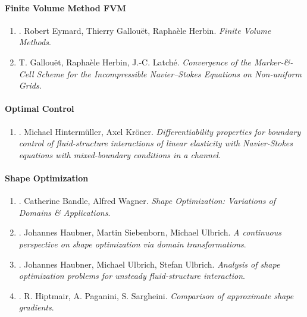 \documentclass{article}
\begin{document}
\paragraph{Finite Volume Method FVM}

\begin{enumerate}
	\item \cite{Eymard_Gallouet_Herbin2019}. Robert Eymard, Thierry Gallou\"et, Rapha\`ele Herbin. {\it Finite Volume Methods}.\hfill{\sf[reading]}
	
	\item T. Gallou\"et, Rapha\`ele Herbin, J.-C. Latch\'e. {\it Convergence of the Marker-\&-Cell Scheme for the Incompressible Navier--Stokes Equations on Non-uniform Grids}.\hfill{\sf[reading]}
\end{enumerate}

\paragraph{Optimal Control}

\begin{enumerate}
	\item \cite{Hintermueller_Kroener2023}. Michael Hinterm\"uller, Axel Kr\"oner. {\it Differentiability properties for boundary control of fluid-structure interactions of linear elasticity with Navier-Stokes equations with mixed-boundary conditions in a channel}.\hfill{\sf[done]}
\end{enumerate}

\paragraph{Shape Optimization}

\begin{enumerate}
	\item \cite{Bandle_Wagner2023}. Catherine Bandle, Alfred Wagner. {\it Shape Optimization: Variations of Domains \& Applications}.\hfill{\sf[reading]}
	
	\item \cite{Haubner_Siebenborn_Ulbrich2021}. Johannes Haubner, Martin Siebenborn, Michael Ulbrich. {\it A continuous perspective on shape optimization via domain transformations}.\hfill{\sf[done]}
	
	\item \cite{Haubner_Ulbrich_Ulbrich2020}. Johannes Haubner, Michael Ulbrich, Stefan Ulbrich. {\it Analysis of shape optimization problems for unsteady fluid-structure interaction}.\hfill{\sf[done]}
	
	\item \cite{Hiptmair_Paganini_Sargheini2015}. R. Hiptmair, A. Paganini, S. Sargheini. {\it Comparison of approximate shape gradients}.\hfill{\sf[done]}
\end{enumerate}
\end{document}
